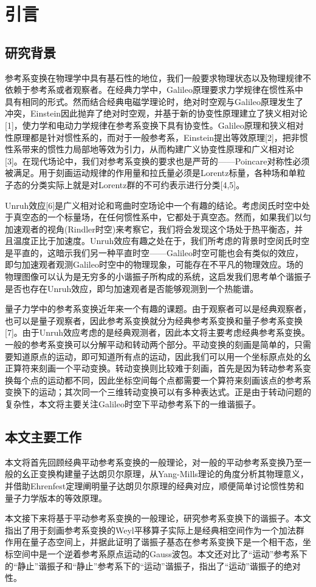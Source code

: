 \documentclass{article}
\begin{document}
    \section{引言}

    \subsection{研究背景}
        参考系变换在物理学中具有基石性的地位，我们一般要求物理状态以及物理规律不依赖于参考系或者观察者。在经典力学中，Galileo原理要求力学规律在惯性系中具有相同的形式。然而结合经典电磁学理论时，绝对时空观与Galileo原理发生了冲突，Einstein因此抛弃了绝对时空观，并基于新的协变性原理建立了狭义相对论[1]，使力学和电动力学规律在参考系变换下具有协变性。Galileo原理和狭义相对性原理都是针对惯性系的，而对于一般参考系，Einstein提出等效原理[2]，把非惯性系带来的惯性力局部地等效为引力，从而构建广义协变性原理和广义相对论[3]。在现代场论中，我们对参考系变换的要求也是严苛的——Poincare对称性必须被满足。用于刻画运动规律的作用量和拉氏量必须是Lorentz标量，各种场和单粒子态的分类实际上就是对Lorentz群的不可约表示进行分类[4,5]。

        Unruh效应[6]是广义相对论和弯曲时空场论中一个有趣的结论。考虑闵氏时空中处于真空态的一个标量场，在任何惯性系中，它都处于真空态。然而，如果我们以匀加速观者的视角(Rindler时空)来考察它，我们将会发现这个场处于热平衡态，并且温度正比于加速度。Unruh效应有趣之处在于，我们所考虑的背景时空闵氏时空是平直的，这暗示我们另一种平直时空——Galileo时空可能也会有类似的效应，即匀加速观者观测Galileo时空中的物理现象，可能存在不平凡的物理效应。场的物理图像可以认为是无穷多的小谐振子所构成的系统，这启发我们思考单个谐振子是否也存在Unruh效应，即匀加速观者是否能够观测到一个热能谱。

        量子力学中的参考系变换近年来一个有趣的课题。由于观察者可以是经典观察者，也可以是量子观察者，因此参考系变换就分为经典参考系变换和量子参考系变换[7]。由于Unruh效应考虑的是经典观测者，因此本文将主要考虑经典参考系变换。一般的参考系变换可以分解平动和转动两个部分。平动变换的刻画是简单的，只需要知道原点的运动，即可知道所有点的运动，因此我们可以用一个坐标原点处的幺正算符来刻画一个平动变换。转动变换则比较难于刻画，首先是因为转动参考系变换每个点的运动都不同，因此坐标空间每个点都需要一个算符来刻画该点的参考系变换下的运动；其次同一个三维转动变换可以有多种表达式。正是由于转动问题的复杂性，本文将主要关注Galileo时空下平动参考系下的一维谐振子。

    \subsection{本文主要工作}

        本文将首先回顾经典平动参考系变换的一般理论，对一般的平动参考系变换乃至一般的幺正变换构建量子达朗贝尔原理，从Yang-Mills理论的角度分析其物理意义，并借助Ehrenfest定理阐明量子达朗贝尔原理的经典对应，顺便简单讨论惯性势和量子力学版本的等效原理。

        本文接下来将基于平动参考系变换的一般理论，研究参考系变换下的谐振子。本文指出了用于刻画参考系变换的Weyl平移算子实际上是经典相空间作为一个加法群作用在量子态空间上，并据此证明了谐振子基态在参考系变换下是一个相干态，坐标空间中是一个逆着参考系原点运动的Gauss波包。本文还对比了“运动”参考系下的“静止”谐振子和“静止”参考系下的“运动”谐振子，指出了“运动”谐振子的绝对性。
\end{document}
